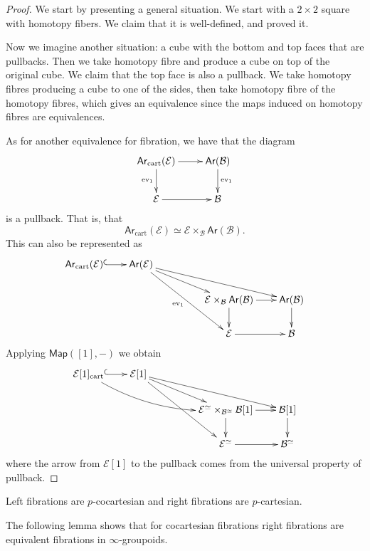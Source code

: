 \begin{proof}
We start by presenting a general situation.
We start with a $2\times 2$ square with homotopy
fibers. We claim that it is well-defined, and proved it.

Now we imagine another situation:
a cube with the bottom and top faces that are pullbacks.
Then we take homotopy fibre and produce a cube on top of
the original cube. We claim that the top face
is also a pullback. We take homotopy fibres producing
a cube to one of the sides, then take homotopy
fibre of the homotopy fibres,
which gives an equivalence since the maps induced
on homotopy fibres are equivalences.

As for another equivalence for fibration,
we have that the diagram
$$
\xymatrix{
\mathsf{Ar}_{\text{cart}}(\mathcal{E})\ar[r]\ar[d]_{\text{ev}_1}&
\mathsf{Ar}(\mathcal{B})\ar[d]^{\text{ev}_1}\\
\mathcal{E}\ar[r]&\mathcal{B}
}
$$
is a pullback. That is, that
$$
\mathsf{Ar}_{\text{cart}}(\mathcal{E})
\simeq \mathcal{E}\times_{\mathcal{B}}\mathsf{Ar}(\mathcal{B}).
$$
This can also be represented as
$$
\xymatrixrowsep{2em}
\xymatrixcolsep{2em}
\xymatrix{
\mathsf{Ar}_{\text{cart}}(\mathcal{E})\ar@{^{(}->}[r]
&\mathsf{Ar}(\mathcal{E}) \ar[rrrd] \ar[rrd] \ar[rrdd]_{\text{ev}_1} & & \\
& & & \mathcal{E}\times_{\mathcal{B}}\mathsf{Ar}(\mathcal{B}) \ar[d] \ar[r] 
& \mathsf{Ar}(\mathcal{B}) \ar[d] \\
& & & \mathcal{E} \ar[r] & \mathcal{B}
}
$$
Applying $\mathsf{Map}([1],-)$ we obtain
$$
\xymatrixrowsep{2em}
\xymatrixcolsep{2em}
\xymatrix{
\mathcal{E}[1]_{\text{cart}}\ar@/_{1pc}/[rrrd]\ar@{^{(}->}[r]
&\mathcal{E}[1] \ar[rrrd] \ar[rrd] \ar[rrdd] & & \\
& & &
\mathcal{E}^{\simeq}\times_{\mathcal{B}^{\simeq}}\mathcal{B}[1]
 \ar[d] \ar[r] 
& \mathcal{B}[1] \ar[d] \\
& & & \mathcal{E}^{\simeq} \ar[r] & \mathcal{B}^{\simeq}
}
$$
where the arrow from $\mathcal{E}[1]$ to the pullback
comes from the universal property of pullback.


\end{proof}

\begin{proposition}
\label{proposition-left-fibrations-are-cocartesian}
Left fibrations are $p$-cocartesian and right fibrations are $p$-cartesian.
\end{proposition}

\noindent
The following lemma shows that for cocartesian fibrations
right fibrations are equivalent
fibrations in $\infty$-groupoids.

